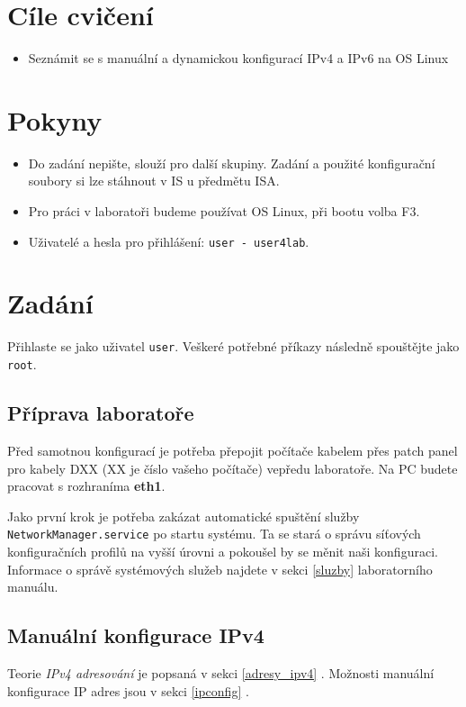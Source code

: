 \section*{Cíle cvičení}
\begin{itemize}
    \item Seznámit se s manuální a dynamickou konfigurací IPv4 a IPv6 na OS Linux
\end{itemize}

\section*{Pokyny}
\begin{itemize}
    \item Do zadání nepište, slouží pro další skupiny. Zadání a použité
        konfigurační soubory si lze stáhnout v IS u předmětu ISA.
    \item Pro práci v laboratoři budeme používat OS Linux, při bootu volba F3.
    \item Uživatelé a hesla pro přihlášení: \texttt{user - user4lab}.
\end{itemize}

\section{Zadání}
Přihlaste se jako uživatel \texttt{user}. Veškeré potřebné příkazy následně
spouštějte jako \texttt{root}.

\subsection{Příprava laboratoře}
Před samotnou konfigurací je potřeba přepojit počítače kabelem přes patch panel
pro kabely DXX (XX je číslo vašeho počítače) vepředu laboratoře. Na PC budete
pracovat s rozhraníma {\bf eth1}.

Jako první krok je potřeba zakázat automatické spuštění služby \texttt{NetworkManager.service} po startu systému. Ta
se stará o správu síťových konfiguračních profilů na vyšší úrovni a pokoušel by
se měnit naši konfiguraci. Informace o správě systémových služeb najdete v
sekci \ref{sluzby} laboratorního manuálu.

\subsection{Manuální konfigurace IPv4}

Teorie \emph{IPv4 adresování} je popsaná v sekci \ref{adresy_ipv4} .
Možnosti manuální konfigurace IP adres jsou v sekci \ref{ipconfig} .

